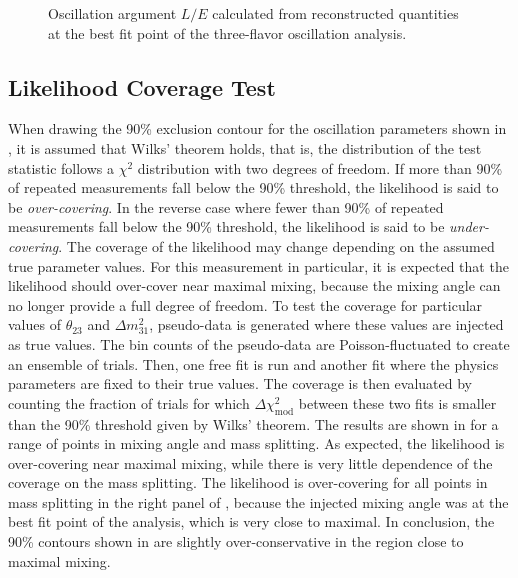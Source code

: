 %     
%     

\begin{figure}
    \centering
    
    \caption{Oscillation argument $L/E$ calculated from reconstructed quantities at the best fit point of the three-flavor oscillation analysis.}
    \label{fig:data_mc_post_fit_l_over_e}
\end{figure}

\subsection{Likelihood Coverage Test}

When drawing the 90\% exclusion contour for the oscillation parameters shown in , it is assumed that Wilks' theorem holds, that is, the distribution of the test statistic follows a $\chi^2$ distribution with two degrees of freedom. If more than 90\% of repeated measurements fall below the 90\% threshold, the likelihood is said to be \emph{over-covering}. In the reverse case where fewer than 90\% of repeated measurements fall below the 90\% threshold, the likelihood is said to be \emph{under-covering}. The coverage of the likelihood may change depending on the assumed true parameter values. For this measurement in particular, it is expected that the likelihood should over-cover near maximal mixing, because the mixing angle can no longer provide a full degree of freedom. To test the coverage for particular values of $\theta_{23}$ and $\Delta m^2_{31}$, pseudo-data is generated where these values are injected as true values. The bin counts of the pseudo-data are Poisson-fluctuated to create an ensemble of trials. Then, one free fit is run and another fit where the physics parameters are fixed to their true values. The coverage is then evaluated by counting the fraction of trials for which $\Delta \chi^2_{\mathrm{mod}}$ between these two fits is smaller than the 90\% threshold given by Wilks' theorem.
The results are shown in  for a range of points in mixing angle and mass splitting.
As expected, the likelihood is over-covering near maximal mixing, while there is very little dependence of the coverage on the mass splitting.
The likelihood is over-covering for all points in mass splitting in the right panel of , because the injected mixing angle was at the best fit point of the analysis, which is very close to maximal.
In conclusion, the 90\% contours shown in  are slightly over-conservative in the region close to maximal mixing.

